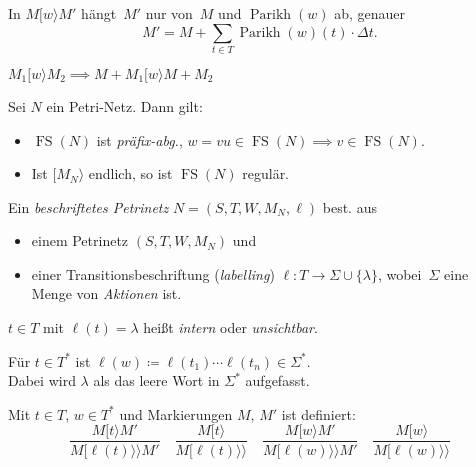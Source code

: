 \documentclass{cheat-sheet}
\newcommand{\activeTransition}[1]{[{#1}\rangle} %
\newcommand{\labelledTransition}[1]{[{#1}\rangle\rangle} %
\DeclareMathOperator{\FS}{FS} %
\DeclareMathOperator{\Parikh}{Parikh} %
\newcommand{\inferrule}[2]{\frac{{#1}}{{#2}}} %
\begin{document}
\begin{lem}
  In $M \activeTransition{w} M'$ hängt~$M'$ nur von~$M$ und $\Parikh(w)$ ab, genauer
  \[
    M' = M + {\sum}_{t \in T} \Parikh(w)(t) \cdot \Delta t.
  \]
\end{lem}

\begin{lem}
  $M_1 \activeTransition{w} M_2 \implies M + M_1 \activeTransition{w} M + M_2$
\end{lem}


\begin{lem}
  Sei $N$ ein Petri-Netz.
  Dann gilt:
  \begin{itemize}
    \item $\FS(N)$ ist \textit{präfix-abg.}, \dh{} $w = v u \in \FS(N) \implies v \in \FS(N)$.
    \item Ist $\activeTransition{M_N}$ endlich, so ist $\FS(N)$ regulär.
  \end{itemize}
\end{lem}

\begin{defn}
  Ein \emph{beschriftetes Petrinetz} $N = (S, T, W, M_N, \ell)$ best. aus
  \begin{itemize}
    \item einem Petrinetz $(S, T, W, M_N)$ und
    \item einer Transitionsbeschriftung (\textit{labelling}) $\ell : T \to \Sigma \cup \{ \lambda \}$, wobei~$\Sigma$ eine Menge von \textit{Aktionen} ist.
  \end{itemize}
\end{defn}

\begin{sprechweise}
  $t \in T$ mit $\ell(t) = \lambda$ heißt \textit{intern} oder \textit{unsichtbar}.
\end{sprechweise}

\begin{nota}
  \begin{minipage}[t]{0.8 \linewidth}
    Für $t \in T^{*}$ ist $\ell(w) \coloneqq \ell(t_1) \cdots \ell(t_n) \in \Sigma^{*}$. \\
    Dabei wird $\lambda$ als das leere Wort in $\Sigma^{*}$ aufgefasst.
  \end{minipage}
\end{nota}

\begin{defn}
  Mit $t \in T$, $w \in T^{*}$ und Markierungen $M$, $M'$ ist definiert:
  \[
    \inferrule
      {M \activeTransition{t} M'}
      {M \labelledTransition{\ell(t)} M'} \quad
    \inferrule
      {M \activeTransition{t}}
      {M \labelledTransition{\ell(t)}} \quad
    \inferrule
      {M \activeTransition{w} M'}
      {M \labelledTransition{\ell(w)} M'} \quad
    \inferrule
      {M \activeTransition{w}}
      {M \labelledTransition{\ell(w)}}
  \]
\end{defn}
\end{document}
